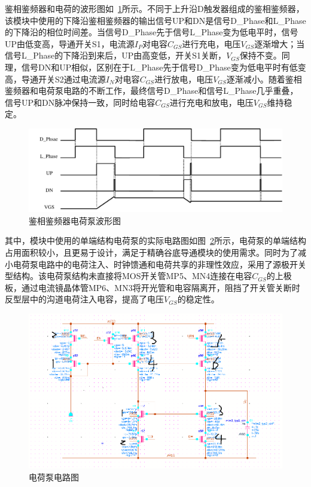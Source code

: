 鉴相鉴频器和电荷的波形图如~\ref{fig:鉴相鉴频器波形图}所示。不同于上升沿D触发器组成的鉴相鉴频器，该模块中使用的下降沿鉴相鉴频器的输出信号UP和DN是信号D\_Phase和L\_Phase的下降沿的相位时间差。当信号D\_Phase先于信号L\_Phase变为低电平时，信号UP由低变高，导通开关S1，电流源$I_P$对电容$C_{GS}$进行充电，电压$V_{GS}$逐渐增大；当信号L\_Phase的下降沿到来后，UP由高变低，开关S1关断，$V_{GS}$保持不变。同理，信号DN和UP相似，区别在于L\_Phase先于信号D\_Phase变为低电平时有低变高，导通开关S2通过电流源$I_N$对电容$C_{GS}$进行放电，电压$V_{GS}$逐渐减小。随着鉴相鉴频器和电荷泵电路的不断工作，最终信号D\_Phase和信号L\_Phase几乎重叠，信号UP和DN脉冲保持一致，同时给电容$C_{GS}$进行充电和放电，电压$V_{GS}$维持稳定。

\begin{figure}[htbp] 
    \centering
    \includegraphics[width=0.8\linewidth]{figures/鉴相鉴频器波形图.pdf}
    \caption{鉴相鉴频器电荷泵波形图}
    \label{fig:鉴相鉴频器波形图}
\end{figure} 

其中，模块中使用的单端结构电荷泵的实际电路图如图~\ref{fig:电荷泵电路图}所示，电荷泵的单端结构占用面积较小，且更易于设计，满足于精确谷底导通模块的使用需求。同时为了减小电荷泵电路中的电荷注入、时钟馈通和电荷共享的非理性效应，采用了源极开关型结构。该电荷泵结构未直接将MOS开关管MP5、MN4连接在电容$C_{GS}$的上极板，通过电流镜晶体管MP6、MN3将开光管和电容隔离开，阻挡了开关管关断时反型层中的沟道电荷注入电容，提高了电压$V_{GS}$的稳定性。

\begin{figure}[htbp] 
    \centering
    \includegraphics[width=0.8\linewidth]{figures/电荷泵电路图.png}
    \caption{电荷泵电路图}
    \label{fig:电荷泵电路图}
\end{figure} 

